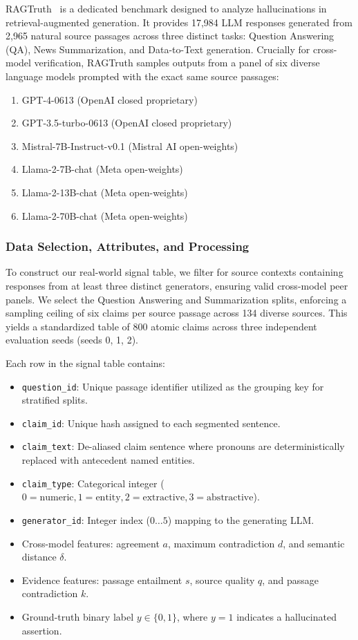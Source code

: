 \documentclass[pdflatex,sn-mathphys,Numbered]{sn-jnl}
\begin{document}
RAGTruth~\cite{niu2024ragtruth} is a dedicated benchmark designed to analyze hallucinations in retrieval-augmented generation. It provides 17,984 LLM responses generated from 2,965 natural source passages across three distinct tasks: Question Answering (QA), News Summarization, and Data-to-Text generation. Crucially for cross-model verification, RAGTruth samples outputs from a panel of six diverse language models prompted with the exact same source passages:
\begin{enumerate}
    \item GPT-4-0613 (OpenAI closed proprietary)
    \item GPT-3.5-turbo-0613 (OpenAI closed proprietary)
    \item Mistral-7B-Instruct-v0.1 (Mistral AI open-weights)
    \item Llama-2-7B-chat (Meta open-weights)
    \item Llama-2-13B-chat (Meta open-weights)
    \item Llama-2-70B-chat (Meta open-weights)
\end{enumerate}

\subsubsection{Data Selection, Attributes, and Processing}
To construct our real-world signal table, we filter for source contexts containing responses from at least three distinct generators, ensuring valid cross-model peer panels. We select the Question Answering and Summarization splits, enforcing a sampling ceiling of six claims per source passage across 134 diverse sources. This yields a standardized table of 800 atomic claims across three independent evaluation seeds (seeds 0, 1, 2). 

Each row in the signal table contains:
\begin{itemize}
    \item \texttt{question\_id}: Unique passage identifier utilized as the grouping key for stratified splits.
    \item \texttt{claim\_id}: Unique hash assigned to each segmented sentence.
    \item \texttt{claim\_text}: De-aliased claim sentence where pronouns are deterministically replaced with antecedent named entities.
    \item \texttt{claim\_type}: Categorical integer ($0=\text{numeric}, 1=\text{entity}, 2=\text{extractive}, 3=\text{abstractive}$).
    \item \texttt{generator\_id}: Integer index ($0 \dots 5$) mapping to the generating LLM.
    \item Cross-model features: agreement $a$, maximum contradiction $d$, and semantic distance $\delta$.
    \item Evidence features: passage entailment $s$, source quality $q$, and passage contradiction $k$.
    \item Ground-truth binary label $y \in \{0, 1\}$, where $y=1$ indicates a hallucinated assertion.
\end{itemize}
\end{document}
